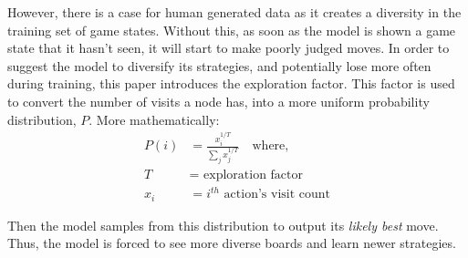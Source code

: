 However, there is a case for human generated data as it creates a diversity in the training set of game states. Without this, as soon as the model is shown a game state that it hasn't seen, it will start to make poorly judged moves. In order to suggest the model to diversify its strategies, and potentially lose more often during training, this paper introduces the exploration factor. This factor is used to convert the number of visits a node has, into a more uniform probability distribution, $P$. More mathematically:
\begin{align}
  P(i) &= \frac{x_i^{1/T}}{\sum_{j}x_j^{1/T}} \quad \text{where,}\\
  T &= \text{ exploration factor} \\
  x_i &= i^{th}\text{ action's visit count}
\end{align}

Then the model samples from this distribution to output its \emph{likely best} move. Thus, the model is forced to see more diverse boards and learn newer strategies.